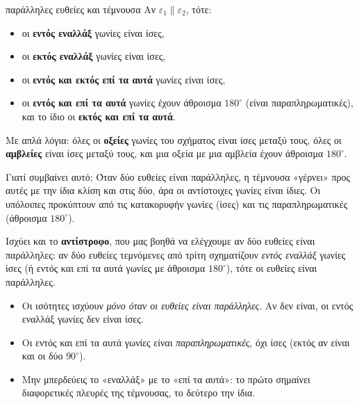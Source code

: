 \begin{kanonas}{παράλληλες ευθείες και τέμνουσα}
Αν $\varepsilon_1\parallel\varepsilon_2$, τότε:
\begin{itemize}[leftmargin=1.2em,itemsep=0.3ex,topsep=2pt]
\item οι \textbf{εντός εναλλάξ} γωνίες είναι ίσες,
\item οι \textbf{εκτός εναλλάξ} γωνίες είναι ίσες,
\item οι \textbf{εντός και εκτός επί τα αυτά} γωνίες είναι ίσες,
\item οι \textbf{εντός και επί τα αυτά} γωνίες έχουν άθροισμα $180^\circ$ (είναι παραπληρωματικές), και το ίδιο οι \textbf{εκτός και επί τα αυτά}.
\end{itemize}
Με απλά λόγια: όλες οι \textbf{οξείες} γωνίες του σχήματος είναι ίσες μεταξύ τους, όλες οι \textbf{αμβλείες} είναι ίσες μεταξύ τους, και μια οξεία με μια αμβλεία έχουν άθροισμα $180^\circ$.
\end{kanonas}

Γιατί συμβαίνει αυτό; Όταν δύο ευθείες είναι παράλληλες, η τέμνουσα «γέρνει» προς αυτές με την ίδια κλίση και στις δύο, άρα οι αντίστοιχες γωνίες είναι ίδιες. Οι υπόλοιπες προκύπτουν από τις κατακορυφήν γωνίες (ίσες) και τις παραπληρωματικές (άθροισμα $180^\circ$).

Ισχύει και το \textbf{αντίστροφο}, που μας βοηθά να ελέγχουμε αν δύο ευθείες είναι παράλληλες: αν δύο ευθείες τεμνόμενες από τρίτη σχηματίζουν \emph{εντός εναλλάξ} γωνίες ίσες (ή εντός και επί τα αυτά γωνίες με άθροισμα $180^\circ$), τότε οι ευθείες είναι παράλληλες.

\begin{prosoxi}
\begin{itemize}[leftmargin=1.2em,itemsep=0.3ex,topsep=2pt]
\item Οι ισότητες ισχύουν \emph{μόνο όταν οι ευθείες είναι παράλληλες}. Αν δεν είναι, οι εντός εναλλάξ γωνίες δεν είναι ίσες.
\item Οι εντός και επί τα αυτά γωνίες είναι \emph{παραπληρωματικές}, όχι ίσες (εκτός αν είναι και οι δύο $90^\circ$).
\item Μην μπερδεύεις το «εναλλάξ» με το «επί τα αυτά»: το πρώτο σημαίνει διαφορετικές πλευρές της τέμνουσας, το δεύτερο την ίδια.
\end{itemize}
\end{prosoxi}


